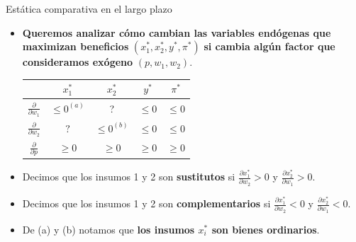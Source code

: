 \documentclass{beamer}
\theoremstyle{definition}
\begin{document}
   

\begin{frame}{Est\'atica comparativa en el largo plazo}\small
	\begin{itemize}[leftmargin=*]
	\item \textbf{Queremos analizar c\'{o}mo cambian las variables endógenas que maximizan beneficios} $(x_1^*,x_2^*,y^*,\pi^*)$ \textbf{si cambia alg\'{u}n factor que consideramos ex\'{o}geno} $(p,w_1,w_2)$. 
	
\begin{center}
\begin{tabular}{|c|c|c|c|c|}
\hline
&$x_1^*$ & $x_2^*$& $y^*$ & $\pi^*$\\[6pt] 
\hline 
$\frac{\partial}{\partial w_1}$ & \color{rosee} $\leq 0^{(a)}$ & \color{gray} ?&\color{rosee}$\leq 0$&\color{cyan}$\leq 0$\\[6pt]
\hline
$\frac{\partial}{\partial w_2}$ &\color{gray}$?$& \color{rosee} $\leq 0^{(b)}$&\color{rosee} $\leq 0$&\color{cyan} $\leq 0$\\[6pt]
\hline
$\frac{\partial}{\partial p}$&\color{rosee}$\geq 0$&\color{rosee}$\geq 0$& \color{rosee}$\geq 0$&\color{cyan}$\geq 0$\\[6pt]
\hline
\end{tabular}
\end{center}
\item Decimos que los insumos 1 y 2 son \textbf{sustitutos} si $\frac{\partial x_1^*}{\partial w_2}>0$ y $\frac{\partial x_2^*}{\partial w_1}>0$.

\item Decimos que los insumos 1 y 2 son \textbf{complementarios} si $\frac{\partial x_1^*}{\partial w_2}<0$ y $\frac{\partial x_2^*}{\partial w_1}<0$.
\item De (a) y (b) notamos que \textbf{los insumos $x_i^*$ son bienes ordinarios}.
  \end{itemize}

  
\end{frame}	
   
\end{document}
